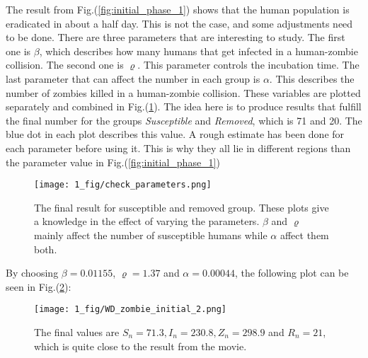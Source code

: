 \documentclass[%
twoside,                 %
final,                   %
chapterprefix=true,      %
open=right               %
10pt]{book}
\begin{document}
The result from Fig.(\ref{fig:initial_phase_1}) shows that the human population is eradicated in about a half day. This is not the case, and some adjustments need to be done. There are three parameters that are interesting to study. The first one is $\beta$, which describes how many humans that get infected in a human-zombie collision. The second one is $\varrho$. This parameter controls the incubation time. The last parameter that can affect the number in each group is $\alpha$. This describes the number of zombies killed in a human-zombie collision. These variables are plotted separately and combined in Fig.(\ref{fig:initial_parameters}). The idea here is to produce results that fulfill the final number for the groups \emph{Susceptible} and \emph{Removed}, which is 71 and 20. The blue dot in each plot describes this value. A rough estimate has been done for each parameter before using it. This is why they all lie in different regions than the parameter value in Fig.(\ref{fig:initial_phase_1})



\begin{figure}[ht]
  \centerline{\texttt{[image: 1\_fig/check\_parameters.png]}}
  \caption{
  \label{fig:initial_parameters} The final result for susceptible and removed group. These plots give a knowledge in the effect of varying the parameters. $\beta$ and $\varrho$ mainly affect the number of susceptible humans while $\alpha$ affect them both.
  }
\end{figure}


By choosing $\beta = 0.01155$, $\varrho=1.37$ and $\alpha=0.00044$, the following plot can be seen in Fig.(\ref{fig:initial_phase_2}):  


\begin{figure}[ht]
  \centerline{\texttt{[image: 1\_fig/WD\_zombie\_initial\_2.png]}}
  \caption{
  \label{fig:initial_phase_2} The final values are $S_n=71.3,I_n=230.8,Z_n=298.9$ and $R_n=21$, which is quite close to the result from the movie.
  }
\end{figure}
\end{document}
